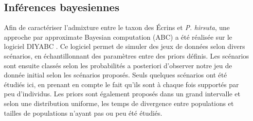 \subsection{Inférences bayesiennes}

Afin de caractériser l'admixture entre le taxon des Écrins et \textit{P. hirsuta}, une approche par approximate Bayesian computation (ABC) a été réalisée sur le logiciel DIYABC \citep{Cornuet2014}.
 Ce logiciel permet de simuler des jeux de données selon divers scénarios, en échantillonnant des paramètres entre des priors définis.
 Les scénarios sont ensuite classés selon les probabilités a posteriori d'observer notre jeu de donnée initial selon les scénarios proposés.
 Seuls quelques scénarios ont été étudiés ici, en prenant en compte le fait qu'ils sont à chaque fois supportés par peu d'individus.
 Les priors sont également proposés dans un grand intervalle et selon une distribution uniforme, les temps de divergence entre populations et tailles de populations n'ayant pas ou peu été étudiés.

